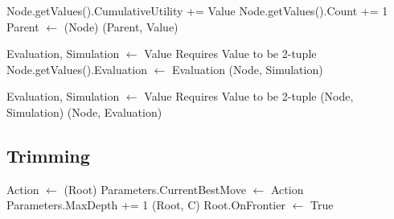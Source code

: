 \begin{algorithm}[H]
    \begin{algorithmic}[1]
            \State Node.getValues().CumulativeUtility += Value
            \State Node.getValues().Count += 1
            \State Parent $\gets$ (Node)
                \State {}(Parent, Value)
            \EndIf
        \EndProcedure
    \end{algorithmic}    
\end{algorithm}

\begin{algorithm}[H]
    \begin{algorithmic}[1]
            \State Evaluation, Simulation $\gets$ Value
            \Comment Requires Value to be 2-tuple
            \State Node.getValues().Evaluation $\gets$ Evaluation
            \State {}(Node, Simulation)
        \EndProcedure
    \end{algorithmic}    
\end{algorithm}

\begin{algorithm}[H]
    \begin{algorithmic}[1]
            \State Evaluation, Simulation $\gets$ Value
            \Comment Requires Value to be 2-tuple
            \State {}(Node, Simulation)
            \State {}(Node, Evaluation)
        \EndProcedure
    \end{algorithmic}    
\end{algorithm}

\newpage
\subsection*{Trimming}

\begin{algorithm}[H]
    \begin{algorithmic}[1]
            \State Action $\gets$ (Root)
            \State Parameters.CurrentBestMove $\gets$ Action
            \State Parameters.MaxDepth += 1
                (Root, C)
            \EndFor
            \State Root.OnFrontier $\gets$ True
        \EndProcedure
    \end{algorithmic}    
\end{algorithm}

